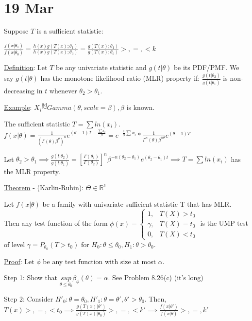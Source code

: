 \documentclass{article}
\newcommand{\real}{\mathbb{R}} %
\let\Oldsum=\sum
\renewcommand{\sum}{\Oldsum\limits}
\newcommand{\iiddist}{\overset{\mathrm{iid}}{\sim}}
\begin{document}
\section{19 Mar}

Suppose $T$ is a sufficient statistic:

$\frac{f(x|\theta_1)}{f(x|\theta_0)} = \frac{h(x)g(T(x); \theta_1)}{h(x)g(T(x); \theta_0)} = \frac{g(T(x); \theta_1)}{g(T(x); \theta_0)} >, =, < k$

\underline{Definition}: Let $T$ be any univariate statistic and $g(t|\theta)$ be its PDF/PMF. We say $g(t|\theta)$ has the monotone likelihood ratio (MLR) property if: $\frac{g(t|\theta_2)}{g(t|\theta_1)}$ is non-decreasing in $t$ whenever $\theta_2 > \theta_1$.

\underline{Example}: $X_i \iiddist Gamma(\theta, scale=\beta), \beta$ is known. 

The sufficient statistic $T = \sum ln(x_i)$. $f(x|\theta) = \frac{1}{(\Gamma(\theta)\beta^{\theta})^n}e^{(\theta-1)T - \frac{\sum x_i}{\beta}} = e^{-\frac{1}{\beta}\sum x_i} * \frac{1}{\Gamma^n(\theta)\beta^{n\theta}}e^{(\theta-1)T}$

Let $\theta_2 > \theta_1 \implies \frac{g(t|\theta_2)}{g(t|\theta_1)} = \left[ \frac{\Gamma(\theta_1)}{\Gamma(\theta_2)} \right]^n \beta^{-n(\theta_2 - \theta_1)} e^{(\theta_2 - \theta_1)t} \implies T = \sum ln(x_i)$ has the MLR property.

\underline{Theorem} - (Karlin-Rubin): $\Theta \in \real^1$

Let $f(x|\theta)$ be a family with univariate sufficient statistic T that has MLR. Then any test function of the form $\phi(x) = \begin{cases} 1, & T(X) > t_0 \\ \gamma, & T(X) = t_0 \\ 0, & T(X) < t_0 \end{cases}$ is the UMP test of level $\gamma = P_{\theta_0}(T > t_0)$ for $H_0: \theta \le \theta_0, H_1: \theta > \theta_0$.

\underline{Proof}: Let $\bar{\phi}$ be any test function with size at most $\alpha$. 

Step 1: Show that $\underset{\theta \le \theta_0}{sup} \beta_{\phi}(\theta) = \alpha$. See Problem 8.26(c) (it's long)

Step 2: Consider $H'_0: \theta = \theta_0, H'_1: \theta = \theta', \theta' > \theta_0$. Then, $T(x) >, =, < t_0 \implies \frac{g(T(x)|\theta')}{g(T(x)|\theta_0)} >, =, < k' \implies \frac{f(x|\theta')}{f(x|\theta)} >, =, k'$
\end{document}
